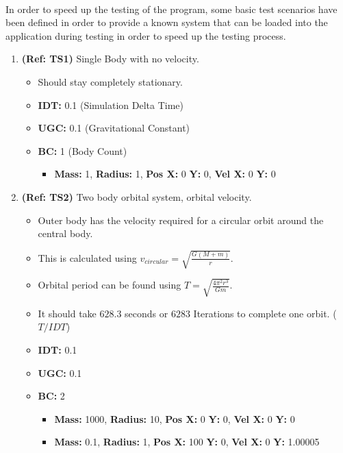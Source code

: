 \paragraph{}
In order to speed up the testing of the program, some basic test scenarios have been defined in order to provide a known system that can be loaded into the application during testing in order to speed up the testing process.
\vspace{12pt}
\begin{enumerate}
\item \textbf{(Ref: TS1)} Single Body with no velocity.
  \begin{itemize}
  \item Should stay completely stationary.
  \item \textbf{IDT:} 0.1 (Simulation Delta Time)
  \item \textbf{UGC:} 0.1 (Gravitational Constant)
  \item \textbf{BC:} 1 (Body Count)
    \begin{itemize}
    \item \textbf{Mass:} 1, \textbf{Radius:} 1, \textbf{Pos X:} 0 \textbf{Y:} 0, \textbf{Vel X:} 0 \textbf{Y:} 0
    \end{itemize}
  \end{itemize}

\vspace{12pt}  
\item \textbf{(Ref: TS2)} Two body orbital system, orbital velocity.
  \begin{itemize}
  \item Outer body has the velocity required for a circular orbit around the central body.
  \item This is calculated using $v_{circular}=\sqrt{\frac{G(M+m)}{r}}$.
  \item Orbital period can be found using $T=\sqrt{\frac{4\pi^2r^3}{Gm}}$.
  \item It should take $628.3$ seconds or $6283$ Iterations to complete one orbit. ($T/IDT$)
  \item \textbf{IDT:} 0.1
  \item \textbf{UGC:} 0.1
  \item \textbf{BC:} 2
    \begin{itemize}
    \item \textbf{Mass:} 1000, \textbf{Radius:} 10, \textbf{Pos X:} 0 \textbf{Y:} 0, \textbf{Vel X:} 0 \textbf{Y:} 0
    \item \textbf{Mass:} 0.1, \textbf{Radius:} 1, \textbf{Pos X:} 100 \textbf{Y:} 0, \textbf{Vel X:} 0 \textbf{Y:} 1.00005
    \end{itemize}
  \end{itemize}
  

\end{enumerate}
